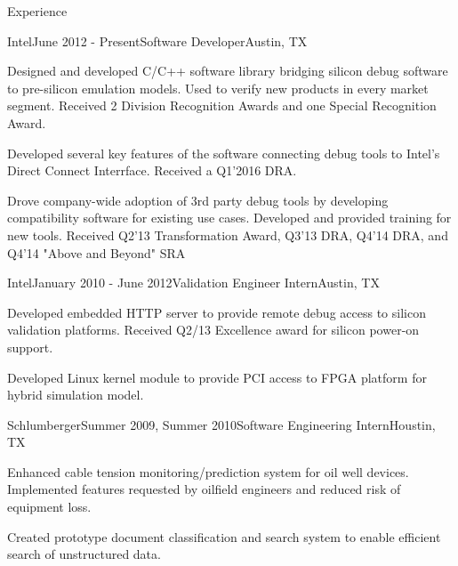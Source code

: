\documentclass{resume} %
\begin{document}
\begin{rSection}{Experience}

\begin{rSubsection}{Intel}{June 2012 - Present}{Software Developer}{Austin, TX}
\item Designed and developed C/C++ software library bridging silicon debug software to pre-silicon emulation models. Used to verify new products in every market segment. Received 2 Division Recognition Awards and one Special Recognition Award.
\item Developed several key features of the software connecting debug tools to Intel's Direct Connect Interrface. Received a Q1'2016 DRA.
\item Drove company-wide adoption of 3rd party debug tools by developing compatibility software for existing use cases. Developed and provided training for new tools. Received Q2'13 Transformation Award, Q3'13 DRA, Q4'14 DRA, and Q4'14 "Above and Beyond" SRA
\end{rSubsection}


\begin{rSubsection}{Intel}{January 2010 - June 2012}{Validation Engineer Intern}{Austin, TX}
\item Developed embedded HTTP server to provide remote debug access to silicon validation platforms. Received Q2/13 Excellence award for silicon power-on support.
\item Developed Linux kernel module to provide PCI access to FPGA platform for hybrid simulation model.
\end{rSubsection}


\begin{rSubsection}{Schlumberger}{Summer 2009, Summer 2010}{Software Engineering Intern}{Houstin, TX}
\item Enhanced cable tension monitoring/prediction system for oil well devices. Implemented features requested by oilfield engineers and reduced risk of equipment loss.  
\item Created prototype document classification and search system to enable efficient search of unstructured data.
\end{rSubsection}

\end{rSection}

\end{document}
